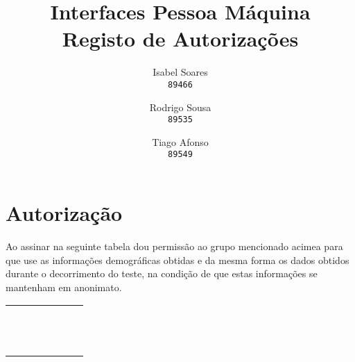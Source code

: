 \documentclass[11pt]{article}
\author{
  Isabel Soares\\
  \texttt{89466}
  \and
  Rodrigo Sousa\\
  \texttt{89535}
  \and
  Tiago Afonso\\
  \texttt{89549}
}
\title{Interfaces Pessoa Máquina\\
Registo de Autorizações}
\begin{document}
    

\maketitle

\section*{Autorização}

Ao assinar na seguinte tabela dou permissão ao grupo mencionado acimea para que use as informações demográficas obtidas e da mesma forma os dados obtidos durante o decorrimento do teste, na condição de que estas informações se mantenham em anonimato.\\

    \begin{tabularx}{\textwidth}{@{\rule[-5ex]{0pt}{7ex}}|*{7}{C|}}
    \hline
    \hline
     &  &  &  \\
    \hline
     &  &  &  \\
    \hline
     &  &  &  \\
    \hline
     &  &  &  \\
    \hline
     &  &  &  \\
    \hline
     &  &  &  \\
    \hline
     &  &  &  \\
    \hline
     &  &  &  \\
    \hline
     &  &  &  \\
    \hline
     &  &  &  \\
    \hline
     &  &  &  \\
    \hline
     &  &  &  \\
    \hline
     &  &  &  \\
    \hline
    \end{tabularx}
    
\end{document}
